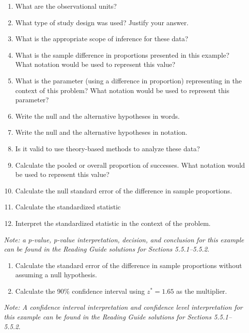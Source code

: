 \documentclass[
]{report}
\newcommand{\rgs}{\vspace{12pt}} %
\begin{document}
\begin{enumerate}
\def\labelenumi{\arabic{enumi}.}
\item
  What are the observational units?
  \rgs
\item
  What type of study design was used? Justify your answer.
  \rgs
\item
  What is the appropriate scope of inference for these data?
  \rgs
\item
  What is the sample difference in proportions presented in this example? What notation would be used to represent this value?
  \rgs
\item
  What is the parameter (using a difference in proportion) representing in the context of this problem? What notation would be used to represent this parameter?
  \rgs
\item
  Write the null and the alternative hypotheses in words.
  \rgs
  \rgs
\item
  Write the null and the alternative hypotheses in notation.
  \rgs
\item
  Is it valid to use theory-based methods to analyze these data?
  \rgs
  \rgs
\item
  Calculate the pooled or overall proportion of successes. What notation would be used to represent this value?
  \rgs
  \rgs
\item
  Calculate the null standard error of the difference in sample proportions.
  \rgs
  \rgs
\item
  Calculate the standardized statistic
  \rgs
  \rgs
\item
  Interpret the standardized statistic in the context of the problem.
  \rgs
  \rgs
\end{enumerate}

\emph{Note: a p-value, p-value interpretation, decision, and conclusion for this example can be found in the Reading Guide solutions for Sections 5.5.1--5.5.2.}

\begin{enumerate}
\def\labelenumi{\arabic{enumi}.}
\setcounter{enumi}{12}
\item
  Calculate the standard error of the difference in sample proportions without assuming a null hypothesis.
  \rgs
  \rgs
\item
  Calculate the 90\% confidence interval using \(z^*=1.65\) as the multiplier.
  \rgs
  \rgs
\end{enumerate}

\emph{Note: A confidence interval interpretation and confidence level interpretation for this example can be found in the Reading Guide solutions for Sections 5.5.1--5.5.2.}
\end{document}

